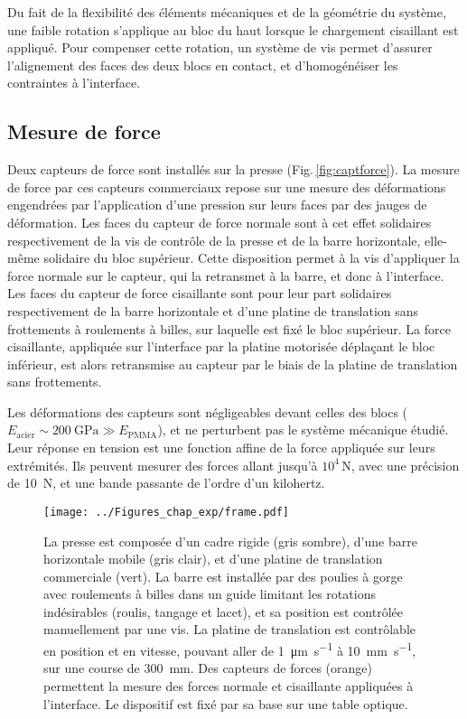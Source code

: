 Du fait de la flexibilité des éléments mécaniques et de la géométrie du système, une faible rotation s'applique au bloc du haut lorsque le chargement cisaillant est appliqué. Pour compenser cette rotation, un système de vis permet d'assurer l'alignement des faces des deux blocs en contact, et d'homogénéiser les contraintes à l'interface.






\subsection{Mesure de force}

Deux capteurs de force sont installés sur la presse (Fig.\,\ref{fig:captforce}). La mesure de force par ces capteurs commerciaux repose sur une mesure des déformations engendrées par l'application d'une pression sur leurs faces par des jauges de déformation.
Les faces du capteur de force normale sont à cet effet solidaires respectivement de la vis de contrôle de la presse et de la barre horizontale, elle-même solidaire du bloc supérieur. Cette disposition permet à la vis d'appliquer la force normale sur le capteur, qui la retransmet à la barre, et donc à l'interface. Les faces du capteur de force cisaillante sont pour leur part solidaires respectivement de la barre horizontale et d'une platine de translation sans frottements à roulements à billes, sur laquelle est fixé le bloc supérieur. La force cisaillante, appliquée sur l'interface par la platine motorisée déplaçant le bloc inférieur, est alors retransmise au capteur par le biais de la platine de translation sans frottements.

Les déformations des capteurs sont négligeables devant celles des blocs ($E_\text{acier}\sim\SI{200}{\giga\pascal}\gg E_\text{PMMA}$), et ne perturbent pas le système mécanique étudié. Leur réponse en tension est une fonction affine de la force appliquée sur leurs extrémités. Ils peuvent mesurer des forces allant jusqu'à  $10^4\,\unit{\N}$, avec une précision de \SI{10}{\N}, et une bande passante de l'ordre d'un kilohertz.


\newpage

\begin{figure}[h!]
\centering
\texttt{[image: ../Figures\_chap\_exp/frame.pdf]}
\caption[Schéma de la presse mécanique]{La presse est composée d'un cadre rigide (gris sombre), d'une barre horizontale mobile (gris clair), et d'une platine de translation commerciale (vert). La barre est installée par des poulies à gorge avec roulements à billes dans un guide limitant les rotations indésirables (roulis, tangage et lacet), et sa position est contrôlée manuellement par une vis. La platine de translation est contrôlable en position et en vitesse, pouvant aller de \SI{1}{\micro\meter\per\second} à \SI{10}{\mm\per\second}, sur une course de \SI{300}{\mm}. Des capteurs de forces (orange) permettent la mesure des forces normale et cisaillante appliquées à l'interface. Le dispositif est fixé par sa base sur une table optique.}
\label{fig:presse}
\end{figure}

